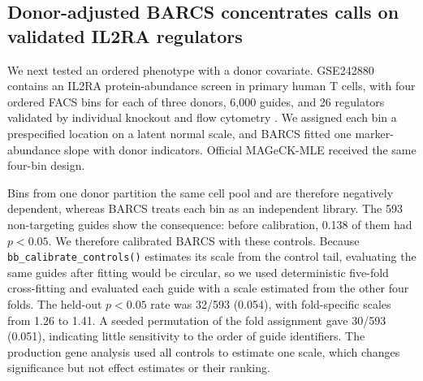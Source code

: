 \subsection{Donor-adjusted BARCS concentrates calls on validated IL2RA
regulators}
\label{sec:facs}

We next tested an ordered phenotype with a donor covariate.  GSE242880
contains an IL2RA protein-abundance screen in primary human T cells, with four
ordered FACS bins for each of three donors, 6,000 guides, and 26 regulators
validated by individual knockout and flow cytometry
\citep{freimer2022il2ra,pimentel2024waterbear}.  We assigned each bin a
prespecified location on a latent normal scale, and BARCS fitted one
marker-abundance slope with donor indicators.  Official MAGeCK-MLE received
the same four-bin design.

Bins from one donor partition the same cell pool and are therefore negatively
dependent, whereas BARCS treats each bin as an independent library.  The 593
non-targeting guides show the consequence: before calibration, 0.138 of them
had $p<0.05$.  We therefore calibrated BARCS with these controls.  Because
\texttt{bb\_calibrate\_controls()} estimates its scale from the control tail,
evaluating the same guides after fitting would be circular, so we used
deterministic five-fold cross-fitting and evaluated each guide with a scale
estimated from the other four folds.  The held-out $p<0.05$ rate was 32/593
(0.054), with fold-specific scales from 1.26 to 1.41.  A seeded permutation of
the fold assignment gave 30/593 (0.051), indicating little sensitivity to the
order of guide identifiers.  The production gene analysis used all controls to
estimate one scale, which changes significance but not effect estimates or
their ranking.

